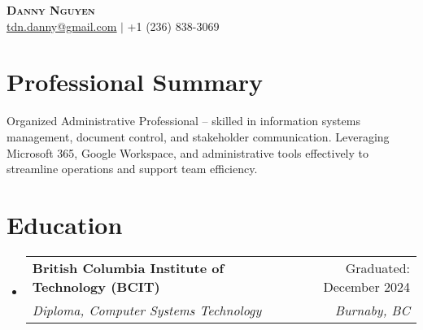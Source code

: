 \documentclass[letterpaper,11pt]{article}
\makeatletter
\newcommand{\resumeSubheading}[4]{
\vspace{-2pt}\item
\begin{tabular*}{0.97\textwidth}[t]{l@{\extracolsep{\fill}}r}
\textbf{#1} & #2 \\
\textit{\small#3} & \textit{\small #4} \\
\end{tabular*}\vspace{-7pt}
}
\newcommand{\resumeSubHeadingListStart}{\begin{itemize}[leftmargin=0.15in, label={}]}
\newcommand{\resumeSubHeadingListEnd}{\end{itemize}}
\makeatother
\begin{document}
\begin{center}
\textbf{\Huge \scshape Danny Nguyen} \\ \vspace{1pt}
\small \href{mailto:tdn.danny@gmail.com}{\underline{tdn.danny@gmail.com}} $|$
+1 (236) 838-3069
\end{center}


\section{Professional Summary} %
Organized Administrative Professional – skilled in information systems management, document control, and stakeholder
communication. Leveraging Microsoft 365, Google Workspace, and administrative tools effectively to streamline operations and
support team efficiency.

\section{Education}
\resumeSubHeadingListStart
\resumeSubheading{British Columbia Institute of Technology (BCIT)}{Graduated: December 2024}{Diploma, Computer Systems Technology}{Burnaby, BC}
\resumeSubHeadingListEnd
\end{document}
